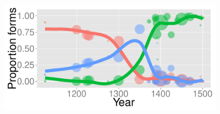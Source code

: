 \documentclass{article}
\begin{document}
\begin{figure}
  \includegraphics{neg-plot-auth}
\end{figure}

\section{}
\end{document}
